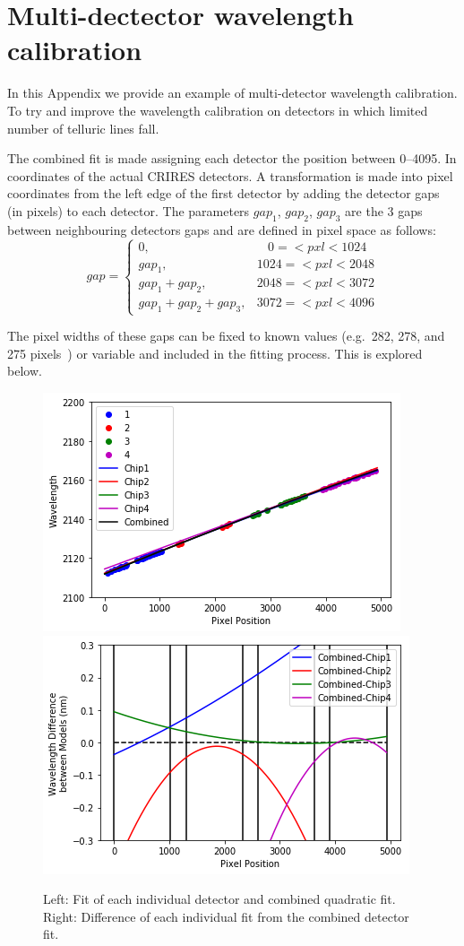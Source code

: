 
\chapter{Multi-dectector wavelength calibration} %
\label{appendix:wavelength_fitting}

In this Appendix we provide an example of multi-detector wavelength calibration.
To try and improve the wavelength calibration on detectors in which limited number of telluric lines fall.


The combined fit is made assigning each detector the position between 0--4095.
In coordinates of the actual {CRIRES} detectors.
A transformation is made into pixel coordinates from the left edge of the first detector by adding the detector gaps (in pixels) to each detector.
The parameters \(gap_{1}\), \(gap_{2}\), \(gap_{3}\) are the 3 gaps between neighbouring detectors gaps and are defined in pixel space as follows:
\[
gap =\begin{cases}
0,                      &~~~~0=<pxl<1024\\
gap_1,                   &1024=<pxl<2048\\
gap_1 + gap_2,            &2048=<pxl<3072\\
gap_1 + gap_2 + gap_3,     &3072=<pxl<4096
\end{cases}
\]

The pixel widths of these gaps can be fixed to known values (e.g.\ 282, 278, and 275 pixels~\citep{brogi_rotation_2016}) or variable and included in the fitting process.
This is explored below.




\begin{figure}
    \centering
    \includegraphics[width=0.45\linewidth]{./figures/appendix/multi_detector_fit}
    \includegraphics[width=0.45\linewidth]{./figures/appendix/multidector_fit_diff}
    \caption{Left: Fit of each individual detector and combined quadratic fit.
Right: Difference of each individual fit from the combined detector fit.}
    \label{fig:multidectorfitdiff}
\end{figure}


